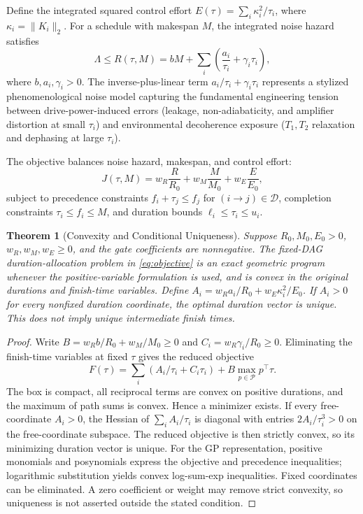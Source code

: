 \documentclass[10pt,letterpaper,journal]{IEEEtran}
\newtheorem{theorem}{Theorem}
\begin{document}
Define the integrated squared control effort $E(\tau) = \sum_i \kappa_i^2 / \tau_i$, where $\kappa_i = \|K_i\|_2$. For a schedule with makespan $M$, the integrated noise hazard satisfies
\begin{equation}\label{eq:risk_model}
\Lambda \le R(\tau, M) = bM + \sum_i \left( \frac{a_i}{\tau_i} + \gamma_i \tau_i \right),
\end{equation}
where $b, a_i, \gamma_i > 0$. The inverse-plus-linear term $a_i/\tau_i + \gamma_i\tau_i$ represents a stylized phenomenological noise model capturing the fundamental engineering tension between drive-power-induced errors (leakage, non-adiabaticity, and amplifier distortion at small $\tau_i$) and environmental decoherence exposure ($T_1, T_2$ relaxation and dephasing at large $\tau_i$).

The objective balances noise hazard, makespan, and control effort:
\begin{equation}\label{eq:objective}
J(\tau, M) = w_R \frac{R}{R_0} + w_M \frac{M}{M_0} + w_E \frac{E}{E_0},
\end{equation}
subject to precedence constraints $f_i + \tau_j \le f_j$ for $(i \to j) \in \mathcal{D}$, completion constraints $\tau_i \le f_i \le M$, and duration bounds $\ell_i \le \tau_i \le u_i$.

\begin{theorem}[Convexity and Conditional Uniqueness]\label{th:exactness}
Suppose $R_0,M_0,E_0>0$, $w_R,w_M,w_E\ge0$, and the gate coefficients are nonnegative. The fixed-DAG duration-allocation problem in \eqref{eq:objective} is an exact geometric program whenever the positive-variable formulation is used, and is convex in the original durations and finish-time variables. Define $A_i=w_Ra_i/R_0+w_E\kappa_i^2/E_0$. If $A_i>0$ for every nonfixed duration coordinate, the optimal duration vector is unique. This does not imply unique intermediate finish times.
\end{theorem}
\begin{proof}
Write $B=w_Rb/R_0+w_M/M_0\ge0$ and $C_i=w_R\gamma_i/R_0\ge0$. Eliminating the finish-time variables at fixed $\tau$ gives the reduced objective
\[F(\tau)=\sum_i(A_i/\tau_i+C_i\tau_i)+B\max_{p\in\mathcal P}p^\top\tau.\]
The box is compact, all reciprocal terms are convex on positive durations, and the maximum of path sums is convex. Hence a minimizer exists. If every free-coordinate $A_i>0$, the Hessian of $\sum_iA_i/\tau_i$ is diagonal with entries $2A_i/\tau_i^3>0$ on the free-coordinate subspace. The reduced objective is then strictly convex, so its minimizing duration vector is unique. For the GP representation, positive monomials and posynomials express the objective and precedence inequalities; logarithmic substitution yields convex log-sum-exp inequalities. Fixed coordinates can be eliminated. A zero coefficient or weight may remove strict convexity, so uniqueness is not asserted outside the stated condition.
\end{proof}
\end{document}
